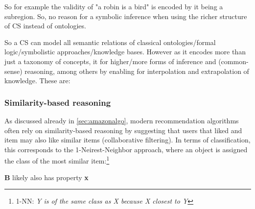 So for example the validity of "a robin is a bird" is encoded by it being a subregion. So, no reason for a symbolic inference when using the richer structure of CS instead of ontologies.

So a CS can model all semantic relations of classical ontologies/formal logic/symbolistic approaches/knowledge bases. However as it encodes more than just a taxonomy of concepts, it for higher/more forms of inference and (common-sense) reasoning, among others by enabling for interpolation and extrapolation of knowledge. These are:

\subsubsection*{Similarity-based reasoning}

\label{sec:similaritybasedreasoning}

As discussed already in \autoref{sec:amazonalgo}, modern recommendation algorithms often rely on similarity-based reasoning by suggesting that users that liked and item may also like similar items (collaborative filtering). In terms of classification, this corresponds to the 1-Neirest-Neighbor approach, where an object is assigned the class of the most similar item:\footnote{1-NN: \textit{Y is of the same class as X because X closest to Y}}

\noindent
\begin{minipage}{.6\textwidth}
\end{minipage}%
\begin{minipage}{.4\textwidth}
             {\textbf{B} likely also has property \textbf{x}}
\end{minipage}%

\vspace{2ex}

